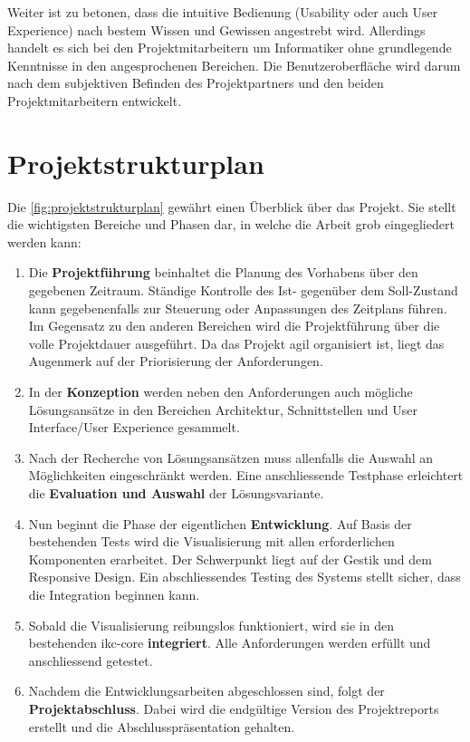 Weiter ist zu betonen, dass die intuitive Bedienung (\gls{Usability} oder auch \gls{User Experience}) nach bestem Wissen und Gewissen angestrebt wird. Allerdings handelt es sich bei den Projektmitarbeitern um Informatiker ohne grundlegende Kenntnisse in den angesprochenen Bereichen. Die Benutzeroberfläche wird darum nach dem subjektiven Befinden des Projektpartners und den beiden Projektmitarbeitern entwickelt.

\section{Projektstrukturplan}
Die \autoref{fig:projektstrukturplan} gewährt einen Überblick über das Projekt. Sie stellt die wichtigsten Bereiche und Phasen dar, in welche die Arbeit grob eingegliedert werden kann:
\begin{enumerate}
    \item Die \textbf{Projektführung} beinhaltet die Planung des Vorhabens über den gegebenen Zeitraum. Ständige Kontrolle des Ist- gegenüber dem Soll-Zustand kann gegebenenfalls zur Steuerung oder Anpassungen des Zeitplans führen. Im Gegensatz zu den anderen Bereichen wird die Projektführung über die volle Projektdauer ausgeführt. Da das Projekt agil organisiert ist, liegt das Augenmerk auf der Priorisierung der Anforderungen.
    \item In der \textbf{Konzeption} werden neben den Anforderungen auch mög\-li\-che Lösungsansätze in den Bereichen Architektur, Schnittstellen und \gls{User Interface}/\gls{User Experience} gesammelt.
    \item Nach der Recherche von Lö\-sungs\-an\-sätz\-en muss allenfalls die Auswahl an Mög\-li\-chkei\-ten eingeschränkt werden. Eine anschliessende Testphase erleichtert die \textbf{Evaluation und Auswahl} der Lösungsvariante.
    \item Nun beginnt die Phase der eigentlichen \textbf{Entwicklung}. Auf Basis der bestehenden Tests wird die Visualisierung mit allen erforderlichen Komponenten erarbeitet. Der Schwerpunkt liegt auf der Gestik und dem \gls{Responsive Design}. Ein abschliessendes Testing des Systems stellt sicher, dass die Integration beginnen kann.
    \item Sobald die Visualisierung reibungslos funktioniert, wird sie in den bestehenden \gls{ikc-core} \textbf{integriert}. Alle Anforderungen werden erfüllt und anschliessend getestet.
    \item Nachdem die Entwicklungsarbeiten abgeschlossen sind, folgt der \textbf{Projektabschluss}. Dabei wird die endgültige Version des Projektreports erstellt und die Abschlusspräsentation gehalten.
\end{enumerate}

